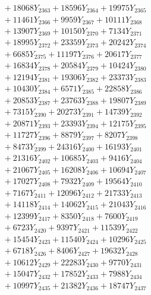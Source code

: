 \documentclass[a4paper,10pt]{article}
\begin{document}
{\begin{align}
&\;  + 18068 Y_{2363} + 18596 Y_{2364} + 19975 Y_{2365} \\[0.3ex]
&\;  + 11461 Y_{2366} + 9959 Y_{2367} + 10111 Y_{2368} \\[0.5ex]\allowbreak
&\;  + 13907 Y_{2369} + 10150 Y_{2370} + 7134 Y_{2371} \\[0.3ex]
&\;  + 18995 Y_{2372} + 23359 Y_{2373} + 20242 Y_{2374} \\[0.3ex]
&\;  + 6685 Y_{2375} + 11197 Y_{2376} + 20617 Y_{2377} \\[0.3ex]
&\;  + 16834 Y_{2378} + 20584 Y_{2379} + 10424 Y_{2380} \\[0.3ex]
&\;  + 12194 Y_{2381} + 19306 Y_{2382} + 23373 Y_{2383} \\[0.3ex]
&\;  + 10430 Y_{2384} + 6571 Y_{2385} + 22858 Y_{2386} \\[0.3ex]
&\;  + 20853 Y_{2387} + 23763 Y_{2388} + 19807 Y_{2389} \\[0.3ex]
&\;  + 7315 Y_{2390} + 20273 Y_{2391} + 14739 Y_{2392} \\[0.3ex]
&\;  + 20871 Y_{2393} + 23393 Y_{2394} + 12175 Y_{2395} \\[0.3ex]
&\;  + 11727 Y_{2396} + 8879 Y_{2397} + 8207 Y_{2398} \\[0.5ex]\allowbreak
&\;  + 8473 Y_{2399} + 24316 Y_{2400} + 16193 Y_{2401} \\[0.3ex]
&\;  + 21316 Y_{2402} + 10685 Y_{2403} + 9416 Y_{2404} \\[0.3ex]
&\;  + 21067 Y_{2405} + 16208 Y_{2406} + 10694 Y_{2407} \\[0.3ex]
&\;  + 17027 Y_{2408} + 7932 Y_{2409} + 19564 Y_{2410} \\[0.3ex]
&\;  + 7167 Y_{2411} + 12096 Y_{2412} + 21733 Y_{2413} \\[0.3ex]
&\;  + 14118 Y_{2414} + 14062 Y_{2415} + 21043 Y_{2416} \\[0.3ex]
&\;  + 12399 Y_{2417} + 8350 Y_{2418} + 7600 Y_{2419} \\[0.3ex]
&\;  + 6723 Y_{2420} + 9397 Y_{2421} + 11539 Y_{2422} \\[0.3ex]
&\;  + 15454 Y_{2423} + 11540 Y_{2424} + 10296 Y_{2425} \\[0.3ex]
&\;  + 6718 Y_{2426} + 8406 Y_{2427} + 19632 Y_{2428} \\[0.5ex]\allowbreak
&\;  + 10612 Y_{2429} + 22283 Y_{2430} + 9770 Y_{2431} \\[0.3ex]
&\;  + 15047 Y_{2432} + 17852 Y_{2433} + 7988 Y_{2434} \\[0.3ex]
&\;  + 10997 Y_{2435} + 21382 Y_{2436} + 18747 Y_{2437} \\[0.3ex]

\end{align}}
\end{document}
